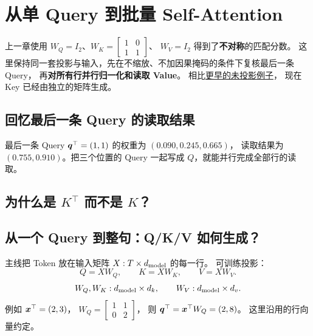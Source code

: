 \chapterrule
\section{从单 Query 到批量 Self-Attention}
\label{intro:self-attention}

\label{intro:self-attention-matrices}
\label{concept:self-attention}


上一章使用 $W_Q=I_2$、$W_K=\begin{bmatrix}1&0\\1&1\end{bmatrix}$、
$W_V=I_2$ 得到了\textbf{不对称}的匹配分数。
这里保持同一套投影与输入，先在不缩放、不加因果掩码的条件下复核最后一条 Query，
再\textbf{对所有行并行归一化和读取 Value}。
相比\hyperref[intro:attention-qkv]{更早的未投影例子}，
现在 Key 已经由独立的矩阵生成。

\subsection{回忆最后一条 Query 的读取结果}
最后一条 Query $\boldsymbol{q}^\top=(1,1)$ 的权重为 $(0.090,0.245,0.665)$，
读取结果为 $(0.755,0.910)$。把三个位置的 Query 一起写成 $Q$，就能并行完成全部行的读取。

\subsection{\texorpdfstring{为什么是 $K^\top$ 而不是 $K$？}{为什么是 K 转置而不是 K？}}
\label{sec:key-layout-card}


\subsection{从一个 Query 到整句：Q/K/V 如何生成？}
主线把 Token 放在输入矩阵 $X:T\times d_{\rm model}$ 的每一行。
可训练投影：
\begin{equation}
\boxed{Q=XW_Q,\qquad K=XW_K,\qquad V=XW_V.}
\label{eq:qkv-from-x}
\end{equation}
\[
W_Q,W_K:d_{\rm model}\times d_k,\qquad
W_V:d_{\rm model}\times d_v.
\]
例如 $\boldsymbol{x}^\top=(2,3)$，
$W_Q=\begin{bmatrix}1&1\\0&2\end{bmatrix}$，
则 $\boldsymbol{q}^\top=\boldsymbol{x}^\top W_Q=(2,8)$。
这里沿用的行向量约定。

